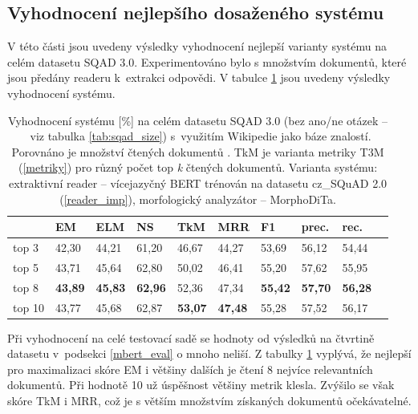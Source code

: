 \subsection{Vyhodnocení nejlepšího dosaženého systému}
\label{best_eval}
V této části jsou uvedeny výsledky vyhodnocení nejlepší varianty systému na celém datasetu SQAD 3.0. Experimentováno bylo s množstvím dokumentů, které jsou předány readeru k~extrakci odpovědi. V tabulce \ref{tab:final_evaluation} jsou uvedeny výsledky vyhodnocení systému.
\begin{table}[H]
    \centering
    \begin{tabular}{|l||l|l|l|l|l|l|l|l|l|}
        \hline
          & \textbf{EM}   & ELM       & NS        & TkM       & MRR       & \textbf{F1}   & prec.         & rec. \\ \hline\hline
            top 3    & 42,30         & 44,21     & 61,20     & 46,67     & 44,27     & 53,69         & 56,12         & 54,44    \\ \hline
            top 5    & 43,71         & 45,64     & 62,80     & 50,02     & 46,41     & 55,20         & 57,62         & 55,95    \\ \hline
            top 8   & \textbf{43,89}         & \textbf{45,83}     & \textbf{62,96}     & 52,36     & 47,34     & \textbf{55,42}         & \textbf{57,70}         & \textbf{56,28}    \\ \hline
            top 10   & 43,77         & 45,68     & 62,87     & \textbf{53,07}     & \textbf{47,48}     & 55,28         & 57,52        & 56,17    \\ \hline
    \end{tabular}
    \caption{Vyhodnocení systému [\%] na celém datasetu SQAD 3.0 (bez ano/ne otázek --~viz tabulka \ref{tab:sqad_size}) s~využitím Wikipedie jako báze znalostí. Porovnáno je množství čtených dokumentů . TkM je varianta metriky T3M (\ref{metriky}) pro různý počet top \emph{k} čtených dokumentů. Varianta systému: extraktivní reader -- vícejazyčný BERT trénován na datasetu cz\_SQuAD 2.0 (\ref{reader_imp}), morfologický analyzátor -- MorphoDiTa.}
    \label{tab:final_evaluation}
\end{table}
Při vyhodnocení na celé testovací sadě se hodnoty od výsledků na čtvrtině datasetu v~podsekci \ref{mbert_eval} o mnoho neliší. Z tabulky \ref{tab:final_evaluation} vyplývá, že nejlepší pro maximalizaci skóre EM i většiny dalších je čtení 8 nejvíce relevantních dokumentů. Při hodnotě 10 už úspěšnost většiny metrik klesla. Zvýšilo se však skóre TkM i MRR, což je s větším množstvím získaných dokumentů očekávatelné.

